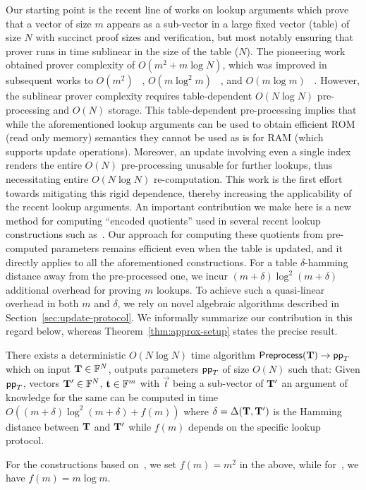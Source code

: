  Our starting point is the recent line of works on lookup arguments which prove
that a vector of size $m$ appears as
a sub-vector in a large fixed vector (table) of size $N$ with succinct proof sizes and verification, but most notably
ensuring that prover runs in time sublinear in the size of the table ($N$). The pioneering work ~\cite{CCS:ZBKMNS22}
obtained prover complexity of $O(m^2+m\log N)$, which was improved in subsequent works to $O(m^2)$ ~\cite{EPRINT:PosKat22},
$O(m\log^2 m)$ ~\cite{EPRINT:ZGKMR22}, and $O(m\log m)$ ~\cite{EPRINT:EagFioGab22,PKC:CFFLL24}. However, the sublinear prover
complexity requires table-dependent $O(N\log N)$ pre-processing and $O(N)$ storage. This table-dependent
pre-processing implies that while
the aforementioned lookup arguments can be used to obtain efficient ROM (read only memory) semantics
they cannot be used as is for RAM (which supports update operations).
Moreover, an update involving even a single
index renders the entire $O(N)$ pre-processing unusable for further lookups,
thus necessitating entire $O(N\log N)$ re-computation. This work is the first effort towards
mitigating this rigid dependence, thereby increasing the applicability of the recent lookup arguments.
An important contribution we make here is a new method for computing ``encoded quotients'' used in several
recent lookup constructions such as~\cite{CCS:ZBKMNS22,EPRINT:PosKat22,EPRINT:EagFioGab22,PKC:CFFLL24}.
Our approach for computing these quotients from pre-computed parameters remains efficient even when
the table is updated, and it directly applies to all the aforementioned constructions.
For a table $\delta$-hamming distance away from the pre-processed one, we incur
$(m+\delta)\log^2(m+\delta)$ additional overhead for proving $m$ lookups. To achieve such a quasi-linear overhead in both $m$ and $\delta$, we rely on novel algebraic algorithms described in Section~\ref{sec:update-protocol}.
We informally summarize our contribution in this regard below, whereas Theorem~\ref{thm:approx-setup}
states the precise result.
\begin{theorem}[Informal]\label{thm:pre-process}
	There exists a deterministic $O(N\log N)$ time algorithm $\textsf{Preprocess}(\mathbf{T})\rightarrow \mathsf{pp}_T$
	which on input $\mathbf{T}\in \mathbb{F}^N$, outputs parameters $\mathsf{pp}_T$ of size $O(N)$ such
	that: Given $\mathsf{pp}_T$, vectors $\mathbf{T}'\in \mathbb{F}^N$, $\mathbf{t}\in \mathbb{F}^m$ with $\vec{t}$ being a sub-vector of $\mathbf{T}'$
	an argument of knowledge for the same can be computed in time
	$O((m+\delta)\log^2 (m+\delta) + f(m))$ where $\delta=\Delta(\mathbf{T}, \mathbf{T}')$
	is the Hamming distance between $\mathbf{T}$ and $\mathbf{T}'$ while $f(m)$ depends on the specific lookup protocol.
\end{theorem}
For the constructions based on~\cite{CCS:ZBKMNS22,EPRINT:PosKat22}, we set $f(m)=m^2$ in the above,
while for~\cite{EPRINT:EagFioGab22,PKC:CFFLL24}, we have $f(m)=m\log m$.

